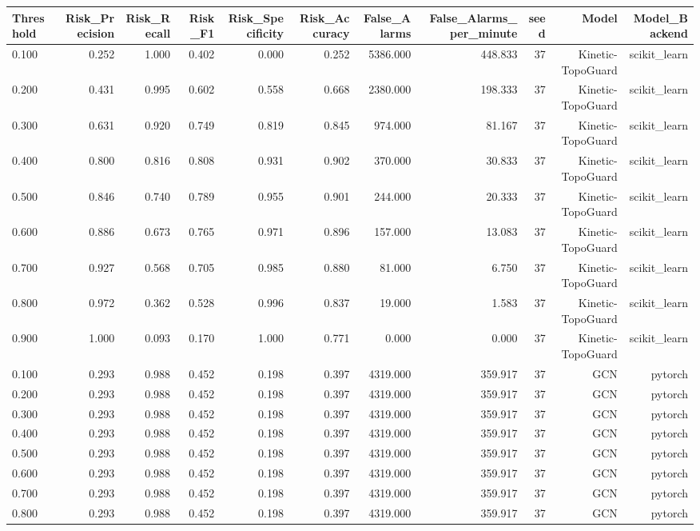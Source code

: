 \begin{tabular}{lrrrrrrrrrr}
\toprule
Threshold & Risk\_Precision & Risk\_Recall & Risk\_F1 & Risk\_Specificity & Risk\_Accuracy & False\_Alarms & False\_Alarms\_per\_minute & seed & Model & Model\_Backend \\
\midrule
0.100 & 0.252 & 1.000 & 0.402 & 0.000 & 0.252 & 5386.000 & 448.833 & 37 & Kinetic-TopoGuard & scikit\_learn \\
0.200 & 0.431 & 0.995 & 0.602 & 0.558 & 0.668 & 2380.000 & 198.333 & 37 & Kinetic-TopoGuard & scikit\_learn \\
0.300 & 0.631 & 0.920 & 0.749 & 0.819 & 0.845 & 974.000 & 81.167 & 37 & Kinetic-TopoGuard & scikit\_learn \\
0.400 & 0.800 & 0.816 & 0.808 & 0.931 & 0.902 & 370.000 & 30.833 & 37 & Kinetic-TopoGuard & scikit\_learn \\
0.500 & 0.846 & 0.740 & 0.789 & 0.955 & 0.901 & 244.000 & 20.333 & 37 & Kinetic-TopoGuard & scikit\_learn \\
0.600 & 0.886 & 0.673 & 0.765 & 0.971 & 0.896 & 157.000 & 13.083 & 37 & Kinetic-TopoGuard & scikit\_learn \\
0.700 & 0.927 & 0.568 & 0.705 & 0.985 & 0.880 & 81.000 & 6.750 & 37 & Kinetic-TopoGuard & scikit\_learn \\
0.800 & 0.972 & 0.362 & 0.528 & 0.996 & 0.837 & 19.000 & 1.583 & 37 & Kinetic-TopoGuard & scikit\_learn \\
0.900 & 1.000 & 0.093 & 0.170 & 1.000 & 0.771 & 0.000 & 0.000 & 37 & Kinetic-TopoGuard & scikit\_learn \\
0.100 & 0.293 & 0.988 & 0.452 & 0.198 & 0.397 & 4319.000 & 359.917 & 37 & GCN & pytorch \\
0.200 & 0.293 & 0.988 & 0.452 & 0.198 & 0.397 & 4319.000 & 359.917 & 37 & GCN & pytorch \\
0.300 & 0.293 & 0.988 & 0.452 & 0.198 & 0.397 & 4319.000 & 359.917 & 37 & GCN & pytorch \\
0.400 & 0.293 & 0.988 & 0.452 & 0.198 & 0.397 & 4319.000 & 359.917 & 37 & GCN & pytorch \\
0.500 & 0.293 & 0.988 & 0.452 & 0.198 & 0.397 & 4319.000 & 359.917 & 37 & GCN & pytorch \\
0.600 & 0.293 & 0.988 & 0.452 & 0.198 & 0.397 & 4319.000 & 359.917 & 37 & GCN & pytorch \\
0.700 & 0.293 & 0.988 & 0.452 & 0.198 & 0.397 & 4319.000 & 359.917 & 37 & GCN & pytorch \\
0.800 & 0.293 & 0.988 & 0.452 & 0.198 & 0.397 & 4319.000 & 359.917 & 37 & GCN & pytorch \\

\end{tabular}
